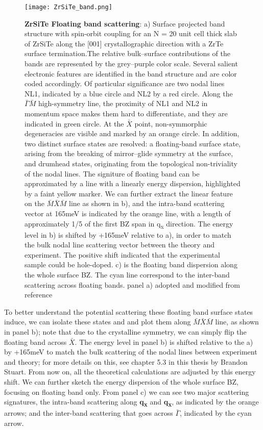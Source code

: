 \begin{figure}
	\texttt{[image: ZrSiTe\_band.png]} 
	\centering
	\captionsetup{width=1.5\textwidth}
	\caption[\textbf{ZrSiTe Floating band scattering}]{\textbf{ZrSiTe Floating band scattering}: a) Surface projected band structure with spin-orbit coupling for an N = 20 unit cell thick slab of ZrSiTe along the [001] crystallographic direction with a ZrTe surface termination.The relative bulk–surface contributions of the bands are represented by the grey–purple color scale. Several salient electronic features are identified in the band structure and are color coded accordingly. Of particular significance are two nodal lines NL1, indicated by a blue circle and NL2 by a red circle. Along the $\bar{\Gamma}\bar{M}$ high-symmetry line, the proximity of NL1 and NL2 in momentum space makes them hard to differentiate, and they are indicated in green circle. At the $\bar{X}$ point, non-symmorphic degeneracies are visible and marked by an orange circle. In addition, two distinct surface states are resolved: a floating-band surface state, arising from the breaking of mirror–glide symmetry at the surface, and drumhead states, originating from the topological non-triviality of the nodal lines. The signiture of floating band can be approximated by a line with a linearly energy dispersion, highlighted by a faint yellow marker. We can further extract the linear feature on the $\bar{M}\bar{X}\bar{M}$ line as shown in b), and the intra-band scattering vector at 165meV is indicated by the orange line, with a length of approximately 1/5 of the first \ac{BZ} span in q\textsubscript{x} direction. The energy level in b) is shifted by +165meV relative to a), in order to match the bulk nodal line scattering vector between the theory and experiment. The positive shift indicated that the experimental sample could be hole-doped. c) is the floating band dispersion along the whole surface \ac{BZ}. The cyan line correspond to the inter-band scattering across floating bands. 
		panel a) adopted and modified from reference \cite{stuartQuasiparticleInterferenceObservation2022}}
	\label{fig:ZrSiTe_floatingband}
\end{figure}

To better understand the potential scattering these floating band surface states induce, we can isolate these states and and plot them along $\bar{M}\bar{X}\bar{M}$ line, as shown in panel b); note that due to the crystalline symmetry, we can simply flip the floating band across $\bar{X}$. The energy level in panel b) is shifted relative to the a) by +165meV to match the bulk scattering of the nodal lines between experiment and theory; for more details on this, see chapter 5.3 in this thesis by Brandon Stuart\cite{stuartScanningTunnellingMicroscopy2021}. From now on, all the theoretical calculations are adjusted by this energy shift. We can further sketch the energy dispersion of the whole surface \ac{BZ}, focusing on floating band only. From panel c) we can see two major scattering signatures, the intra-band scattering along \textbf{q\textsubscript{x}} and \textbf{q\textsubscript{x}}, as indicated by the orange arrows; and the inter-band scattering that goes across $\bar{\Gamma}$, indicated by the cyan arrow. 

